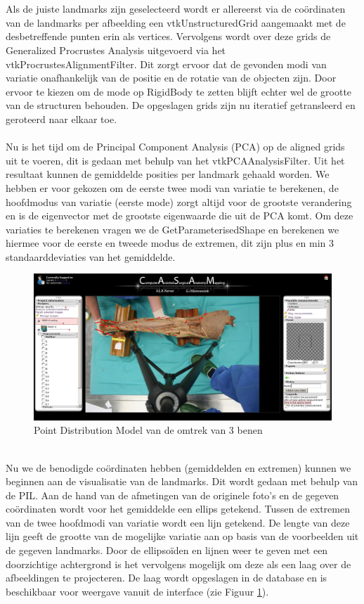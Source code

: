 \\
\\
Als de juiste landmarks zijn geselecteerd wordt er allereerst via de co\"{o}rdinaten van de landmarks per afbeelding een vtkUnstructuredGrid aangemaakt met de desbetreffende punten erin als vertices. 
Vervolgens wordt over deze grids de Generalized Procrustes Analysis uitgevoerd via het vtkProcrustesAlignmentFilter. 
Dit zorgt ervoor dat de gevonden modi van variatie onafhankelijk van de positie en de rotatie van de objecten zijn. 
Door ervoor te kiezen om de mode op RigidBody te zetten blijft echter wel de grootte van de structuren behouden. 
De opgeslagen grids zijn nu iteratief getransleerd en geroteerd naar elkaar toe.
\\
\\
Nu is het tijd om de Principal Component Analysis (PCA) op de aligned grids uit te voeren, dit is gedaan met behulp van het vtkPCAAnalysisFilter.
Uit het resultaat kunnen de gemiddelde posities per landmark gehaald worden. 
We hebben er voor gekozen om de eerste twee modi van variatie te berekenen, de hoofdmodus van variatie (eerste mode) zorgt altijd voor de grootste verandering en is de eigenvector met de grootste eigenwaarde die uit de PCA komt. 
Om deze variaties te berekenen vragen we de GetParameterisedShape en berekenen we hiermee voor de eerste en tweede modus de extremen, dit zijn plus en min 3 standaarddeviaties van het gemiddelde.
\\
\begin{figure}[htbp]
\includegraphics[width=\textwidth]{screen2}
\caption{Point Distribution Model van de omtrek van 3 benen}
\label{fig:screen2}
\end{figure}
\\
Nu we de benodigde co\"{o}rdinaten hebben (gemiddelden en extremen) kunnen we beginnen aan de visualisatie van de landmarks. 
Dit wordt gedaan met behulp van de PIL. Aan de hand van de afmetingen van de originele foto's en de gegeven co\"{o}rdinaten wordt voor het gemiddelde een ellips getekend. 
Tussen de extremen van de twee hoofdmodi van variatie wordt een lijn getekend. 
De lengte van deze lijn geeft de grootte van de mogelijke variatie aan op basis van de voorbeelden uit de gegeven landmarks. 
Door de ellipso\"{i}den en lijnen weer te geven met een doorzichtige achtergrond is het vervolgens mogelijk om deze als een laag over de afbeeldingen te projecteren. 
De laag wordt opgeslagen in de database en is beschikbaar voor weergave vanuit de interface (zie Figuur \ref{fig:screen2}).


